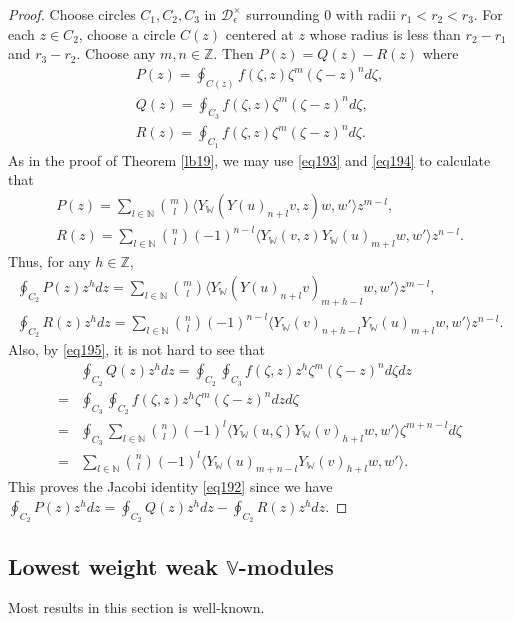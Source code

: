 \documentclass[12pt,b5paper,notitlepage]{report}
\theoremstyle{definition}
\theoremstyle{plain}
\newcommand{\mc}{\mathcal}
\newcommand{\bk}[1]{\langle {#1}\rangle}
\newcommand{\Vbb}{\mathbb V}
\newcommand{\Wbb}{\mathbb W}
\newcommand{\Nbb}{\mathbb N}
\newcommand{\Zbb}{\mathbb Z}
\numberwithin{equation}{section}
\begin{document}
\begin{proof}
Choose circles $C_1,C_2,C_3$ in $\mc D_\epsilon^\times$ surrounding $0$ with radii $r_1<r_2<r_3$.  For each $z\in C_2$, choose a circle $C(z)$ centered at $z$ whose radius is less than $r_2-r_1$ and $r_3-r_2$. Choose any $m,n\in\Zbb$. Then $P(z)=Q(z)-R(z)$ where
\begin{gather*}
P(z)=\oint_{C(z)}f(\zeta,z)\zeta^m(\zeta-z)^nd\zeta,\\
Q(z)=\oint_{C_3}f(\zeta,z)\zeta^m(\zeta-z)^nd\zeta,\\
R(z)=\oint_{C_1}f(\zeta,z)\zeta^m(\zeta-z)^nd\zeta.
\end{gather*}
As in the proof of Theorem \ref{lb19}, we may use \eqref{eq193} and \eqref{eq194} to calculate that
\begin{gather*}
P(z)=\sum_{l\in\Nbb}{m\choose l}\bk{Y_\Wbb(Y(u)_{n+l}v,z)w,w'}z^{m-l},\\
R(z)=\sum_{l\in\Nbb}{n\choose l}(-1)^{n-l}\bk{Y_\Wbb(v,z)Y_\Wbb(u)_{m+l}w,w'}z^{n-l}.
\end{gather*}
Thus, for any $h\in\Zbb$,
\begin{gather*}
\oint_{C_2} P(z)z^hdz=\sum_{l\in\Nbb}{m\choose l}\bk{Y_\Wbb(Y(u)_{n+l}v)_{m+h-l}w,w'}z^{m-l},\\
\oint_{C_2}R(z)z^hdz=\sum_{l\in\Nbb}{n\choose l}(-1)^{n-l}\bk{Y_\Wbb(v)_{n+h-l}Y_\Wbb(u)_{m+l}w,w'}z^{n-l}.
\end{gather*}
Also, by \eqref{eq195}, it is not hard to see that
\begin{align*}
&\oint_{C_2} Q(z)z^hdz=\oint_{C_2}\oint_{C_3}f(\zeta,z)z^h\zeta^m(\zeta-z)^nd\zeta dz\\
=&\oint_{C_3}\oint_{C_2}f(\zeta,z)z^h\zeta^m(\zeta-z)^ndz d\zeta\\
=&\oint_{C_3}\sum_{l\in\Nbb}{n\choose l}(-1)^{l}\bk{Y_\Wbb(u,\zeta)Y_\Wbb(v)_{h+l}w,w'}\zeta^{m+n-l}d\zeta\\
=&\sum_{l\in\Nbb}{n\choose l}(-1)^{l}\bk{Y_\Wbb(u)_{m+n-l}Y_\Wbb(v)_{h+l}w,w'}.
\end{align*}
This proves the Jacobi identity \eqref{eq192} since we have $\oint_{C_2}P(z)z^hdz=\oint_{C_2}Q(z)z^hdz-\oint_{C_2}R(z)z^hdz$.
\end{proof}



\subsection*{Lowest weight weak $\Vbb$-modules}

Most results in this section is well-known.
\end{document}
